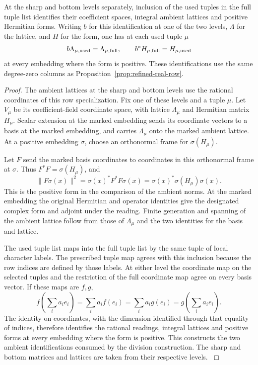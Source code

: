 \begin{lemma}\label{lem:real-ambient-tuples}
At the sharp and bottom levels separately, inclusion of the used
tuples in the full tuple list identifies their coefficient spaces,
integral ambient lattices and positive Hermitian forms. Writing \(b\) for this identification at one of the two levels, \(\Lambda\) for the lattice, and \(H\) for the form, one has at each used tuple \(\mu\)
\[
 b\Lambda_{\mu,{\rm used}}=\Lambda_{\mu,{\rm full}},\qquad b^*H_{\mu,{\rm full}}=H_{\mu,{\rm used}}
\]
at every embedding where the form is positive. These identifications use the
same degree-zero columns as Proposition~\ref{prop:refined-real-row}.
\end{lemma}

\begin{proof}
The ambient lattices at the sharp and bottom levels use
the rational coordinates of this row specialization. Fix one of these levels and a tuple \(\mu\). Let
\(V_\mu\) be its coefficient-field coordinate space, with
lattice \(\Lambda_\mu\) and Hermitian matrix \(H_\mu\).
Scalar extension at the marked embedding sends its coordinate vectors to a
basis at the marked embedding, and carries \(\Lambda_\mu\)
onto the marked ambient lattice. At a positive embedding
\(\sigma\), choose an orthonormal frame for
\(\sigma(H_\mu)\).

Let \(F\) send the marked basis coordinates to coordinates in this orthonormal frame at \(\sigma\). Thus \(F^*F=\sigma(H_\mu)\), and
\[
 \|F\sigma(x)\|^2=\sigma(x)^*F^*F\sigma(x)=\sigma(x)^*\sigma(H_\mu)\sigma(x).
\] This is the positive form
in the comparison of the ambient norms. At the marked
embedding the original Hermitian and operator identities
give the designated complex form and adjoint under the
reading. Finite generation and spanning of the ambient
lattice follow from those of \(\Lambda_\mu\) and the two
identities for the basis and lattice.

The used tuple list maps into the full tuple list by the
same tuple of local character labels. The prescribed tuple
map agrees with this inclusion because the row indices are
defined by those labels. At either level the coordinate map on the selected tuples and the restriction of the full coordinate map agree on every basis vector. If these maps are \(f,g\),
\[
 f\!\left(\sum_i a_i e_i\right)=\sum_i a_i f(e_i)=\sum_i a_i g(e_i)=g\!\left(\sum_i a_i e_i\right).
\] The identity on coordinates, with the
dimension identified through that equality of indices,
therefore identifies the rational readings, integral
lattices and positive forms at every embedding where the
form is positive. This constructs the two ambient
identifications consumed by the division construction.
The sharp and bottom matrices and lattices are taken from
their respective levels.
\label{cor:real-row-realization-8}
\end{proof}

